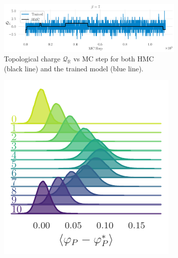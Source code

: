 \documentclass{article} %
\begin{document}
\begin{figure}[htpb]
\begin{subfigure}{0.65\textwidth}
   \end{subfigure}
   \hfill
   \begin{subfigure}{\textwidth}
      \includegraphics[width=\textwidth]{figures/topological_freezing_anl_blue_wide.pdf}
      \caption{\label{fig:topological_freezing}Topological charge \(\mathcal{Q}_{\mathbb{R}}\) vs MC
      step for both HMC (black line) and the trained model (blue line).}%
   \end{subfigure}
   \hfill
   \begin{subfigure}{0.31\textwidth}
      \includegraphics[width=\textwidth]{figures/plaqsf_1758.pdf}

\end{subfigure}
\end{figure}
\end{document}
